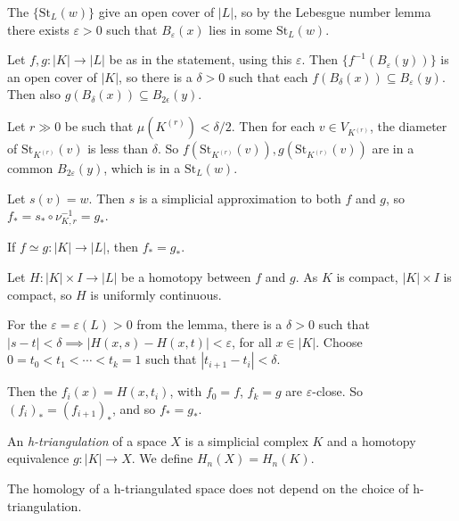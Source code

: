 \documentclass[12pt]{article}
\begin{document}
\begin{proofbox}
	The $\{\mathrm{St}_L(w)\}$ give an open cover of $|L|$, so by the Lebesgue number lemma there exists $\varepsilon > 0$ such that $B_\varepsilon(x)$ lies in some $\mathrm{St}_L(w)$.

	Let $f, g : |K| \to |L|$ be as in the statement, using this $\varepsilon$. Then $\{f^{-1}(B_\varepsilon(y))\}$ is an open cover of $|K|$, so there is a $\delta > 0$ such that each $f(B_{\delta}(x)) \subseteq B_{\varepsilon}(y)$. Then also $g(B_{\delta}(x)) \subseteq B_{2 \epsilon}(y)$.

	Let $r \gg 0$ be such that $\mu(K^{(r)}) < \delta/2$. Then for each $v \in V_{K^{(r)}}$, the diameter of $\mathrm{St}_{K^{(r)}}(v)$ is less than $\delta$. So $f(\mathrm{St}_{K^{(r)}}(v)), g(\mathrm{St}_{K^{(r)}}(v))$ are in a common $B_{2 \varepsilon}(y)$, which is in a $\mathrm{St}_L(w)$.

	Let $s(v) = w$. Then $s$ is a simplicial approximation to both $f$ and $g$, so $f_\ast = s_\ast \circ \nu_{K, r}^{-1} = g_\ast$.
\end{proofbox}

\begin{theorem}
	If $f \simeq g : |K| \to |L|$, then $f_\ast = g_\ast$.
\end{theorem}

\begin{proofbox}
	Let $H : |K| \times I \to |L|$ be a homotopy between $f$ and $g$. As $K$ is compact, $|K| \times I$ is compact, so $H$ is uniformly continuous.

	For the $\varepsilon = \varepsilon(L) > 0$ from the lemma, there is a $\delta > 0$ such that $|s - t| < \delta \implies |H(x, s) - H(x, t)| < \varepsilon$, for all $x \in |K|$. Choose $0 = t_0 < t_1 < \cdots < t_k =1$ such that $|t_{i+1} - t_i| < \delta$.

	Then the $f_i(x) = H(x, t_i)$, with $f_0 = f$, $f_k = g$ are $\varepsilon$-close. So $(f_i)_\ast = (f_{i+1})_\ast$, and so $f_\ast = g_\ast$.
\end{proofbox}

\begin{definition}
	An \emph{h-triangulation} of a space $X$ is a simplicial complex $K$ and a homotopy equivalence $g : |K| \to X$. We define $H_n(X) = H_n(K)$.
\end{definition}

\begin{lemma}
	The homology of a h-triangulated space does not depend on the choice of h-triangulation.
\end{lemma}
\end{document}
